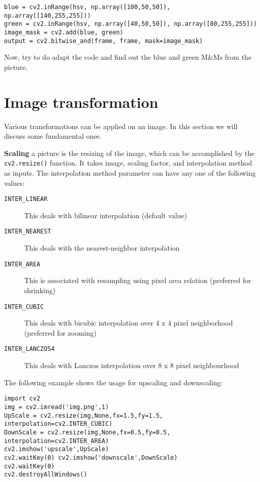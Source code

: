 \documentclass{labo}
\begin{document}
\begin{verbatim}
blue = cv2.inRange(hsv, np.array([100,50,50]), np.array([140,255,255]))
green = cv2.inRange(hsv, np.array([40,50,50]), np.array([80,255,255]))
image_mask = cv2.add(blue, green)
output = cv2.bitwise_and(frame, frame, mask=image_mask)
\end{verbatim}

\begin{leftbar}
Now, try to do adapt the code and find out the {\color{blue}blue} and {\color{green}green} M\&Ms from the picture.
\end{leftbar}

\section*{Image transformation}
Various transformations can be applied on an image. In this section we will discuss some fundamental ones.

\textbf{Scaling} a picture is the resizing of the image, which can be accomplished by the \texttt{cv2.resize()} function. It takes image, scaling factor, and interpolation method as inputs.
The interpolation method parameter can have any one of the following values:
\begin{description}
	\item[\texttt{INTER\_LINEAR}] This deals with bilinear interpolation (default value)
	\item[\texttt{INTER\_NEAREST}] This deals with the nearest-neighbor interpolation
	\item[\texttt{INTER\_AREA}] This is associated with resampling using pixel area relation (preferred for shrinking)
	\item[\texttt{INTER\_CUBIC}] This deals with bicubic interpolation over 4 x 4 pixel neighborhood (preferred for zooming)
	\item[\texttt{INTER\_LANCZOS4}] This deals with Lanczos interpolation over 8 x 8 pixel neighbourhood
\end{description}

The following example shows the usage for upscaling and downscaling:

\begin{verbatim}
import cv2
img = cv2.imread('img.png',1)
UpScale = cv2.resize(img,None,fx=1.5,fy=1.5, interpolation=cv2.INTER_CUBIC) 
DownScale = cv2.resize(img,None,fx=0.5,fy=0.5, interpolation=cv2.INTER_AREA) 
cv2.imshow('upscale',UpScale) 
cv2.waitKey(0) cv2.imshow('downscale',DownScale)
cv2.waitKey(0) 
cv2.destroyAllWindows()
\end{verbatim}
\end{document}
